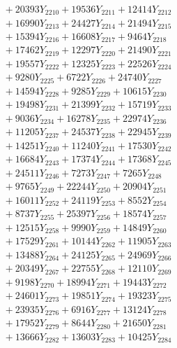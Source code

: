 \documentclass[a4paper,10pt]{article}
\begin{document}
{\begin{align}
&\;  + 20393 Y_{2210} + 19536 Y_{2211} + 12414 Y_{2212} \\[0.3ex]
&\;  + 16990 Y_{2213} + 24427 Y_{2214} + 21494 Y_{2215} \\[0.3ex]
&\;  + 15394 Y_{2216} + 16608 Y_{2217} + 9464 Y_{2218} \\[0.5ex]\allowbreak
&\;  + 17462 Y_{2219} + 12297 Y_{2220} + 21490 Y_{2221} \\[0.3ex]
&\;  + 19557 Y_{2222} + 12325 Y_{2223} + 22526 Y_{2224} \\[0.3ex]
&\;  + 9280 Y_{2225} + 6722 Y_{2226} + 24740 Y_{2227} \\[0.3ex]
&\;  + 14594 Y_{2228} + 9285 Y_{2229} + 10615 Y_{2230} \\[0.3ex]
&\;  + 19498 Y_{2231} + 21399 Y_{2232} + 15719 Y_{2233} \\[0.3ex]
&\;  + 9036 Y_{2234} + 16278 Y_{2235} + 22974 Y_{2236} \\[0.3ex]
&\;  + 11205 Y_{2237} + 24537 Y_{2238} + 22945 Y_{2239} \\[0.3ex]
&\;  + 14251 Y_{2240} + 11240 Y_{2241} + 17530 Y_{2242} \\[0.3ex]
&\;  + 16684 Y_{2243} + 17374 Y_{2244} + 17368 Y_{2245} \\[0.3ex]
&\;  + 24511 Y_{2246} + 7273 Y_{2247} + 7265 Y_{2248} \\[0.5ex]\allowbreak
&\;  + 9765 Y_{2249} + 22244 Y_{2250} + 20904 Y_{2251} \\[0.3ex]
&\;  + 16011 Y_{2252} + 24119 Y_{2253} + 8552 Y_{2254} \\[0.3ex]
&\;  + 8737 Y_{2255} + 25397 Y_{2256} + 18574 Y_{2257} \\[0.3ex]
&\;  + 12515 Y_{2258} + 9990 Y_{2259} + 14849 Y_{2260} \\[0.3ex]
&\;  + 17529 Y_{2261} + 10144 Y_{2262} + 11905 Y_{2263} \\[0.3ex]
&\;  + 13488 Y_{2264} + 24125 Y_{2265} + 24969 Y_{2266} \\[0.3ex]
&\;  + 20349 Y_{2267} + 22755 Y_{2268} + 12110 Y_{2269} \\[0.3ex]
&\;  + 9198 Y_{2270} + 18994 Y_{2271} + 19443 Y_{2272} \\[0.3ex]
&\;  + 24601 Y_{2273} + 19851 Y_{2274} + 19323 Y_{2275} \\[0.3ex]
&\;  + 23935 Y_{2276} + 6916 Y_{2277} + 13124 Y_{2278} \\[0.5ex]\allowbreak
&\;  + 17952 Y_{2279} + 8644 Y_{2280} + 21650 Y_{2281} \\[0.3ex]
&\;  + 13666 Y_{2282} + 13603 Y_{2283} + 10425 Y_{2284} \\[0.3ex]

\end{align}}
\end{document}
